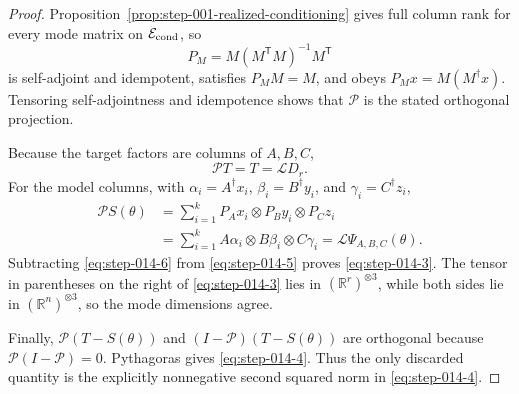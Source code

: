 \begin{proof}
Proposition~\ref{prop:step-001-realized-conditioning} gives full column rank
for every mode matrix on \(\mathcal E_{\rm cond}\), so
\[
  P_M=M(M^{\mathsf T}M)^{-1}M^{\mathsf T}
\]
is self-adjoint and idempotent, satisfies \(P_MM=M\), and obeys
\(P_Mx=M(M^\dagger x)\). Tensoring self-adjointness and idempotence shows that
\(\mathcal P\) is the stated orthogonal projection.

Because the target factors are columns of \(A,B,C\),
\begin{equation}
  \mathcal PT=T=\mathcal LD_r.                            \label{eq:step-014-5}
\end{equation}
For the model columns, with
\(\alpha_i=A^\dagger x_i\), \(\beta_i=B^\dagger y_i\), and
\(\gamma_i=C^\dagger z_i\),
\begin{equation}
\begin{aligned}
  \mathcal P S(\theta)
  &=\sum_{i=1}^k P_Ax_i\otimes P_By_i\otimes P_Cz_i\\
  &=\sum_{i=1}^k A\alpha_i\otimes B\beta_i\otimes C\gamma_i
   =\mathcal L\Psi_{A,B,C}(\theta).
\end{aligned}\label{eq:step-014-6}
\end{equation}
Subtracting \eqref{eq:step-014-6} from \eqref{eq:step-014-5} proves \eqref{eq:step-014-3}. The tensor in parentheses on the right
of \eqref{eq:step-014-3} lies in \((\mathbb R^r)^{\otimes3}\), while both sides lie in
\((\mathbb R^n)^{\otimes3}\), so the mode dimensions agree.

Finally, \(\mathcal P(T-S(\theta))\) and
\((I-\mathcal P)(T-S(\theta))\) are orthogonal because
\(\mathcal P(I-\mathcal P)=0\). Pythagoras gives \eqref{eq:step-014-4}. Thus the only discarded
quantity is the explicitly nonnegative second squared norm in \eqref{eq:step-014-4}.


\end{proof}


